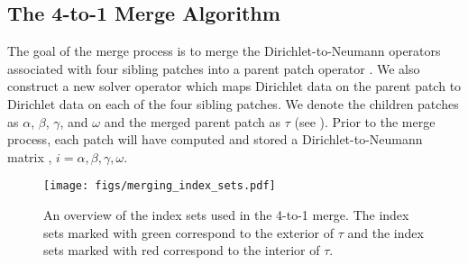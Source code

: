 
\subsection{The 4-to-1 Merge Algorithm}
\label{sub:4-to-1merge}

The goal of the merge process is to merge the Dirichlet-to-Neumann operators associated with four sibling patches into a parent patch operator \Ttau.   We also construct a new solver operator \Stau which maps Dirichlet data on the parent patch to Dirichlet data on each of the four sibling patches.  We denote the children patches as $\alpha$, $\beta$, $\gamma$, and $\omega$ and the merged parent patch as $\tau$ (see ). Prior to the merge process, each patch will have computed and stored a Dirichlet-to-Neumann matrix \Ti, $i=\alpha, \beta, \gamma, \omega$. 
\begin{figure}
    \centering
    \texttt{[image: figs/merging\_index\_sets.pdf]}
    \caption{An overview of the index sets used in the 4-to-1 merge. The index sets marked with green correspond to the exterior of $\tau$ and the index sets marked with red correspond to the interior of $\tau$.}
    \label{fig:merged_index_sets}
\end{figure}

